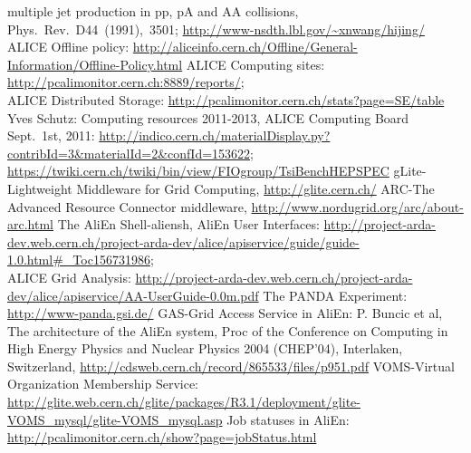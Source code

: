 \documentclass{intech}
\begin{document}
\begin{thebibliography}{100}
multiple jet production in pp, pA and AA collisions,\\ Phys.~Rev.~D44~(1991),~3501;
         \newline\url{http://www-nsdth.lbl.gov/~xnwang/hijing/}
%
 ALICE Offline policy:
\newline\url{http://aliceinfo.cern.ch/Offline/General-Information/Offline-Policy.html}
%
 ALICE Computing sites:
\newline\url{http://pcalimonitor.cern.ch:8889/reports/};\\
ALICE Distributed Storage: \newline\url{http://pcalimonitor.cern.ch/stats?page=SE/table}
%
 Yves Schutz: Computing resources 2011-2013, ALICE Computing Board
Sept.~1st, 2011:
\newline\url{http://indico.cern.ch/materialDisplay.py?contribId=3&materialId=2&confId=153622};\\
\newline\url{https://twiki.cern.ch/twiki/bin/view/FIOgroup/TsiBenchHEPSPEC}
%
%
  gLite-Lightweight Middleware for Grid Computing,
\newline\url{http://glite.cern.ch/}
%
  ARC-The Advanced Resource Connector middleware,
\newline\url{http://www.nordugrid.org/arc/about-arc.html}
%
 The AliEn Shell-aliensh,
         AliEn User Interfaces:
\newline\url{http://project-arda-dev.web.cern.ch/project-arda-dev/alice/apiservice/guide/guide-1.0.html#_Toc156731986};\\
         ALICE Grid Analysis:
\newline\url{http://project-arda-dev.web.cern.ch/project-arda-dev/alice/apiservice/AA-UserGuide-0.0m.pdf}
%
  The PANDA Experiment: \url{http://www-panda.gsi.de/}
%
 GAS-Grid Access Service in AliEn:
         P. Buncic et al, The architecture of the AliEn system,
         Proc of the Conference on Computing in High Energy Physics and Nuclear Physics
         2004 (CHEP'04), Interlaken, Switzerland,
         \newline\url{http://cdsweb.cern.ch/record/865533/files/p951.pdf}
%
 VOMS-Virtual Organization Membership Service:
\newline\url{http://glite.web.cern.ch/glite/packages/R3.1/deployment/glite-VOMS_mysql/glite-VOMS_mysql.asp}
%
 Job statuses in AliEn:
\newline\url{http://pcalimonitor.cern.ch/show?page=jobStatus.html}

\end{thebibliography}
\end{document}
